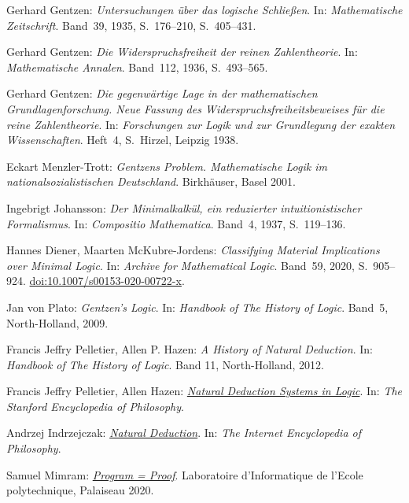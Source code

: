 
\begin{thebibliography}{00}

Gerhard Gentzen: \emph{Untersuchungen über das logische Schließen}.
In: \emph{Mathematische Zeitschrift}. Band~39, 1935, S.~176--210,
S.~405--431.

Gerhard Gentzen: \emph{Die Widerspruchsfreiheit der reinen
Zahlentheorie}. In: \emph{Mathematische Annalen}. Band~112,
1936, S.~493--565.

Gerhard Gentzen: \emph{Die gegenwärtige Lage in der mathematischen
Grundlagenforschung. Neue Fassung des Widerspruchsfreiheitsbeweises für
die reine Zahlentheorie}. In: \emph{Forschungen zur Logik und zur
Grundlegung der exakten Wissenschaften}. Heft~4, S.~Hirzel,
Leipzig 1938.

Eckart Menzler-Trott: \emph{Gentzens Problem. Mathematische Logik
im nationalsozialistischen Deutschland}. Birkhäuser, Basel 2001.

Ingebrigt Johansson: \emph{Der Minimalkalkül, ein reduzierter
intuitionistischer Formalismus}. In: \emph{Compositio Mathematica}.
Band~4, 1937, S.~119–136.

Hannes Diener, Maarten McKubre-Jordens: \emph{Classifying Material
Implications over Minimal Logic}. In: \emph{Archive for Mathematical
Logic}. Band~59, 2020, S.~905--924.
\href{https://doi.org/10.1007/s00153-020-00722-x}%
{doi:10.1007/s00153-020-00722-x}.

Jan von Plato: \emph{Gentzen's Logic}. In: \emph{Handbook of The
History of Logic}. Band~5, North-Holland, 2009.

Francis Jeffry Pelletier, Allen P. Hazen: \emph{A History of Natural
Deduction}. In: \emph{Handbook of The History of Logic}.
Band 11, North-Holland, 2012.

 Francis Jeffry Pelletier, Allen Hazen:
\href{https://plato.stanford.edu/entries/natural-deduction/}%
{\emph{Natural Deduction Systems in Logic}}.
In: \emph{The Stanford Encyclopedia of Philosophy}.

Andrzej Indrzejczak:
\href{https://iep.utm.edu/natural-deduction/}{\emph{Natural Deduction}}.
In: \emph{The Internet Encyclopedia of Philosophy}.

Samuel Mimram:
\emph{\href{https://www.lix.polytechnique.fr/Labo/Samuel.Mimram/publications/}%
{Program = Proof}}.
Laboratoire d'Informatique de l'Ecole polytechnique, Palaiseau 2020.


\end{thebibliography}
